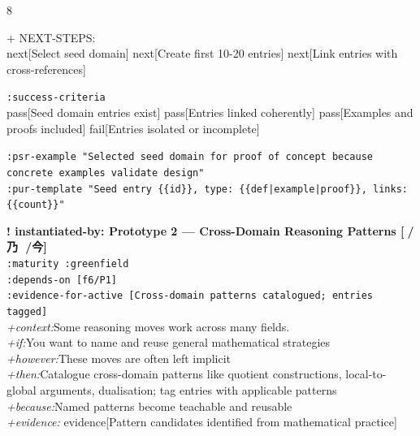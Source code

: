 \documentclass[landscape]{article}
\newcommand{\flexitag}[1]{\textcolor[gray]{0.35}{\textit{#1}}}
\newenvironment{devmapgreenfield}{%
  \def\FrameCommand{\colorbox{devmapgreenfieldbg}}%
  \setlength{\fboxsep}{2pt}%
  \MakeFramed{\advance\hsize-\width \FrameRestore}%
}{\endMakeFramed}
\begin{document}
\begin{paracol}{8}
\begin{devmapgreenfield}
\par
  + NEXT-STEPS:\\
    next[Select seed domain] next[Create first 10-20 entries] next[Link entries with cross-references]\\
\par
  \texttt{:\allowbreak{}success-\allowbreak{}criteria}\\
    pass[Seed domain entries exist] pass[Entries linked coherently] pass[Examples and proofs included] fail[Entries isolated or incomplete]\\
\par
  \texttt{:\allowbreak{}psr-\allowbreak{}example "Selected seed domain for proof of concept because concrete examples validate design"}\\
  \texttt{:\allowbreak{}pur-\allowbreak{}template "Seed entry \{\{id\}\},\allowbreak{} type:\allowbreak{} \{\{def|\allowbreak{}example|\allowbreak{}proof\}\},\allowbreak{} links:\allowbreak{} \{\{count\}\}"}\\
\par
\par
\end{devmapgreenfield}
\begin{devmapgreenfield}
\textbf{! instantiated-by: Prototype 2 — Cross-Domain Reasoning Patterns [💬/乃 🔺/今]}\\
  \texttt{:\allowbreak{}maturity :\allowbreak{}greenfield}\\
  \texttt{:\allowbreak{}depends-\allowbreak{}on [f6/\allowbreak{}P1]}\\
  \texttt{:\allowbreak{}evidence-\allowbreak{}for-\allowbreak{}active [Cross-\allowbreak{}domain patterns catalogued;\allowbreak{} entries tagged]}\\
  \flexitag{+context:}Some reasoning moves work across many fields.\\
  \flexitag{+if:}You want to name and reuse general mathematical strategies\\
  \flexitag{+however:}These moves are often left implicit\\
  \flexitag{+then:}Catalogue cross-domain patterns like quotient constructions, local-to-global arguments, dualisation; tag entries with applicable patterns\\
  \flexitag{+because:}Named patterns become teachable and reusable\\
  \flexitag{+evidence:} evidence[Pattern candidates identified from mathematical practice]\\
\par

\end{devmapgreenfield}
\end{paracol}
\end{document}
